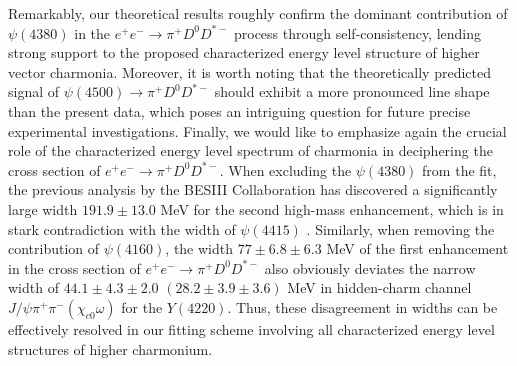 \documentclass[final,5p,times,twocolumn]{elsarticle}
\begin{document}
Remarkably, our theoretical results roughly confirm the dominant contribution of $\psi(4380)$ in the $e^+e^- \to\pi^+ D^0 D^{*-}$ process through self-consistency, lending strong support to the proposed characterized energy level structure of higher vector charmonia. Moreover, it is worth noting that the theoretically predicted signal of $\psi(4500)\to \pi^{+}D^0D^{*-}$ should exhibit a more pronounced line shape than the present data, which poses an intriguing question for future precise experimental investigations.
{ Finally, we would like to emphasize again the crucial role of the characterized energy level spectrum of charmonia in deciphering the cross section of $e^+e^- \to \pi^+D^0D^{*-}$. When excluding the $\psi(4380)$ from the fit, the previous analysis by the BESIII Collaboration has discovered a significantly large width $191.9\pm13.0$ MeV for the second high-mass enhancement, which is in stark contradiction with the width of $\psi(4415)$   \cite{BESIII:2018iea}. Similarly, when removing the contribution of $\psi(4160)$, the width $77\pm6.8\pm6.3$ MeV of the first enhancement in the cross section of $e^+e^- \to \pi^+D^0D^{*-}$ \cite{BESIII:2018iea} also obviously deviates the narrow width of $44.1\pm4.3\pm2.0$ $(28.2\pm3.9\pm3.6)$ MeV in hidden-charm channel $J/\psi\pi^+\pi^-(\chi_{c0}\omega)$ \cite{BESIII:2016bnd,BESIII:2019gjc} for the $Y(4220)$. Thus, these disagreement in widths can be  effectively resolved in our fitting scheme involving all characterized energy level structures of higher charmonium.}




 



\begin{table}[t]
  	\caption{The fitted parameters of describing the cross section distribution of $e^+e^- \to\pi^+ D^0 D^{*-}$ based on the scheme involving the characterized energy level structures of higher charmonia, where the $\chi^2/d.o.f.=0.74$.}
  \end{table}  
\end{document}
